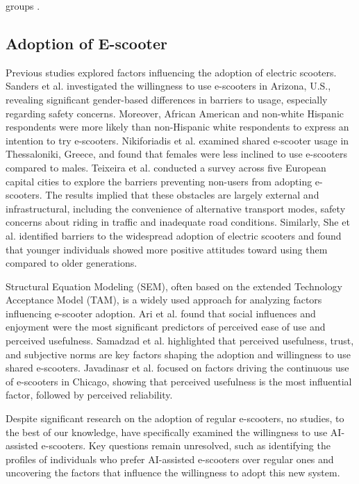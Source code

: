 groups \cite{thomas2020perception}.

\subsection{Adoption of E-scooter}
Previous studies explored factors influencing the adoption of electric scooters. 
Sanders et al. \cite{sanders2020scoot} investigated the willingness to use e-scooters in Arizona, U.S., revealing significant gender-based differences in barriers to usage, especially regarding safety concerns. Moreover, African American and non-white Hispanic respondents were more likely than non-Hispanic white respondents to express an intention to try e-scooters. Nikiforiadis et al. \cite{nikiforiadis2021analysis} examined shared e-scooter usage in Thessaloniki, Greece, and found that females were less inclined to use e-scooters compared to males.
Teixeira et al. \cite{teixeira2023barriers} conducted a survey across five European capital cities to explore the barriers preventing non-users from adopting e-scooters. The results implied that these obstacles are largely external and infrastructural, including the convenience of alternative transport modes, safety concerns about riding in traffic and inadequate road conditions. Similarly, She et al.\cite{she2017barriers} identified barriers to the widespread adoption of electric scooters and found that younger individuals showed more positive attitudes toward using them compared to older generations.

Structural Equation Modeling (SEM), often based on the extended Technology Acceptance Model (TAM), is a widely used approach for analyzing factors influencing e-scooter adoption\cite{ari2024investigating,samadzad2023factors,javadinasr2022eliciting}. Ari et al. \cite{ari2024investigating} found that social influences and enjoyment were the most significant predictors of perceived ease of use and perceived usefulness. Samadzad et al. \cite{samadzad2023factors} highlighted that perceived usefulness, trust, and subjective norms are key factors shaping the adoption and willingness to use shared e-scooters. Javadinasr et al. \cite{javadinasr2022eliciting} focused on factors driving the continuous use of e-scooters in Chicago, showing that perceived usefulness is the most influential factor, followed by perceived reliability.

Despite significant research on the adoption of regular e-scooters, no studies, to the best of our knowledge, have specifically examined the willingness to use AI-assisted e-scooters. Key questions remain unresolved, such as identifying the profiles of individuals who prefer AI-assisted e-scooters over regular ones and uncovering the factors that influence the willingness to adopt this new system.


